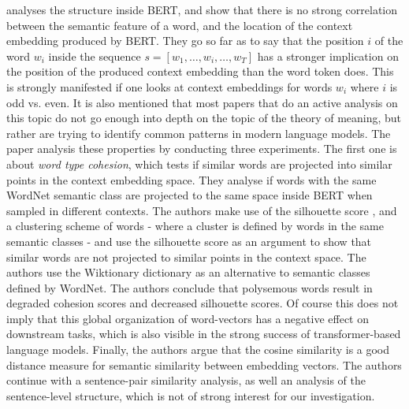 \documentclass[a4paper,12pt,twoside,openright]{report}
\begin{document}
\cite{mickus19} analyses the structure inside BERT, and show that there is no strong correlation between the semantic feature of a word, and the location of the context embedding produced by BERT.
They go so far as to say that the position $i$ of the word $w_i$ inside the sequence $s = [w_1, \ldots, w_i, \ldots, w_T]$ has a stronger implication on the position of the produced context embedding than the word token does.
This is strongly manifested if one looks at context embeddings for words $w_i$ where $i$ is odd vs. even.
It is also mentioned that most papers that do an active analysis on this topic do not go enough into depth on the topic of the theory of meaning, but rather are trying to identify common patterns in modern language models.
The paper analysis these properties by conducting three experiments.
The first one is about \textit{word type cohesion}, which tests if similar words are projected into similar points in the context embedding space.
They analyse if words with the same WordNet semantic class are projected to the same space inside BERT when sampled in different contexts.
The authors make use of the silhouette score \cite{rousseeuw87}, and a clustering scheme of words - where a cluster is defined by words in the same semantic classes - and use the silhouette score as an argument to show that similar words are not projected to similar points in the context space.
The authors use the Wiktionary dictionary \cite{wiktionary} as an alternative to  semantic classes defined by WordNet.
The authors conclude that polysemous words result in degraded cohesion scores and decreased silhouette scores.
Of course this does not imply that this global organization of word-vectors has a negative effect on downstream tasks, which is also visible in the strong success of transformer-based language models.
Finally, the authors argue that the cosine similarity is a good distance measure for semantic similarity between embedding vectors.
The authors continue with a sentence-pair similarity analysis, as well an analysis of the sentence-level structure, which is not of strong interest for our investigation. \\
\end{document}

